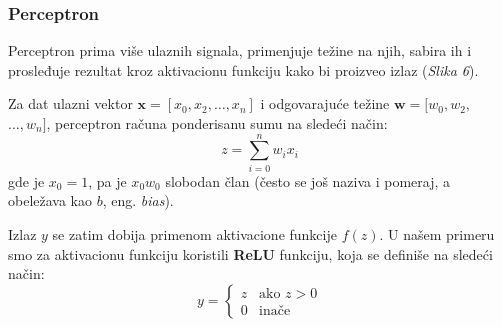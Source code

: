 \documentclass[12pt]{article}
\begin{document}
   \subsubsection*{Perceptron}
    \vspace{-0.5cm}
   Perceptron prima više ulaznih signala, primenjuje težine na njih, 
   sabira ih i prosleđuje rezultat kroz aktivacionu funkciju kako bi proizveo izlaz (\textit{Slika 6}).
   
   Za dat ulazni vektor \(\mathbf{x} = [x_0, x_2, \ldots, x_n]\) i odgovarajuće težine 
   $\mathbf{w} = [w_0, w_2,$ $\ldots, w_n]$, perceptron računa ponderisanu sumu na sledeći način:
   \[
   z = \sum_{i=0}^{n} w_i x_i
   \]
   gde je \(x_0=1\), pa je $x_0w_0$ slobodan član (često se još naziva i pomeraj, a obeležava kao $b$, eng. \textit{bias}).
   
   Izlaz \(y\) se zatim dobija primenom aktivacione funkcije \(f(z)\). U našem primeru smo za
   aktivacionu funkciju koristili \textbf{ReLU} funkciju, koja se definiše na sledeći način:
   \[
      y = 
      \begin{cases}
         z & \text{ako } z > 0 \\
         0 & \text{inače}
      \end{cases}
      \]
      
\end{document}
